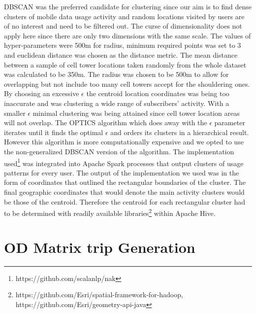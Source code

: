 \documentclass[12pt, a4paper]{report}
\theoremstyle{definition}
\theoremstyle{definition}%
\theoremstyle{definition}%
\theoremstyle{definition}%
\theoremstyle{definition}%
\theoremstyle{definition}%
\begin{document}
DBSCAN was the preferred candidate for clustering since our aim is to find dense clusters of mobile data usage activity and random locations visited by users are of no interest and need to be filtered out. The curse of dimensionality does not apply here since there are only two dimensions with the same scale.  The values of hyper-parameters were 500m for radius, minimum required points was set to 3 and euclidean distance was chosen as the distance metric. The mean distance between a sample of cell tower locations taken randomly from the whole dataset was calculated to be 350m. The radius was chosen to be 500m to allow for overlapping but not include too many cell towers accept for the shouldering ones. By choosing an excessive $\epsilon$ the centroid location coordinates was being too inaccurate and was clustering a wide range of subscribers' activity. With a smaller $\epsilon$ minimal clustering was being attained since cell tower location areas will not overlap. The OPTICS algorithm which does away with the $\epsilon$ parameter iterates until it finds the optimal $\epsilon$ and orders its clusters in a hierarchical result. However this algorithm is more computationally expensive and we opted to use the non-generalized DBSCAN version of the algorithm. The implementation used\footnote{https://github.com/scalanlp/nak} was integrated into Apache Spark processes that output clusters of usage patterns for every user. The output of the implementation we used was in the form of coordinates that outlined the rectangular boundaries of the cluster. The final geographic coordinates that would denote the main activity clusters would be those of the centroid. Therefore the centroid for each rectangular cluster had to be determined with readily available libraries\footnote{https://github.com/Esri/spatial-framework-for-hadoop, https://github.com/Esri/geometry-api-java} within Apache Hive.   






\section{OD Matrix trip Generation}
\end{document}
